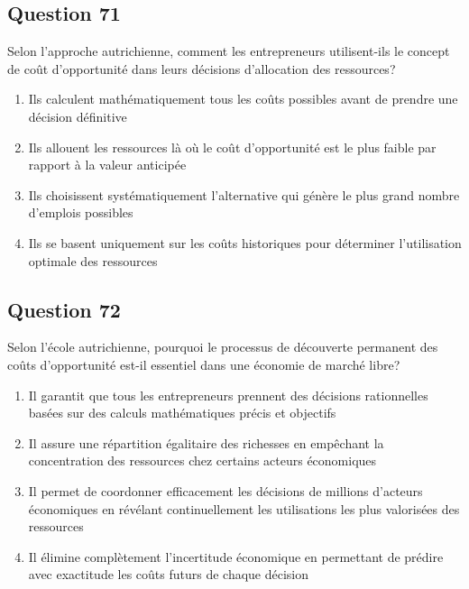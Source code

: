 \documentclass[12pt,a4paper]{article}
\begin{document}
\bigskip


\subsection*{Question 71}
Selon l'approche autrichienne, comment les entrepreneurs utilisent-ils le concept de coût d'opportunité dans leurs décisions d'allocation des ressources?

\begin{enumerate}[label=\Alph*., leftmargin=*]
\item Ils calculent mathématiquement tous les coûts possibles avant de prendre une décision définitive
\item Ils allouent les ressources là où le coût d'opportunité est le plus faible par rapport à la valeur anticipée
\item Ils choisissent systématiquement l'alternative qui génère le plus grand nombre d'emplois possibles
\item Ils se basent uniquement sur les coûts historiques pour déterminer l'utilisation optimale des ressources
\end{enumerate}

\bigskip


\subsection*{Question 72}
Selon l'école autrichienne, pourquoi le processus de découverte permanent des coûts d'opportunité est-il essentiel dans une économie de marché libre?

\begin{enumerate}[label=\Alph*., leftmargin=*]
\item Il garantit que tous les entrepreneurs prennent des décisions rationnelles basées sur des calculs mathématiques précis et objectifs
\item Il assure une répartition égalitaire des richesses en empêchant la concentration des ressources chez certains acteurs économiques
\item Il permet de coordonner efficacement les décisions de millions d'acteurs économiques en révélant continuellement les utilisations les plus valorisées des ressources
\item Il élimine complètement l'incertitude économique en permettant de prédire avec exactitude les coûts futurs de chaque décision
\end{enumerate}

\bigskip
\end{document}
